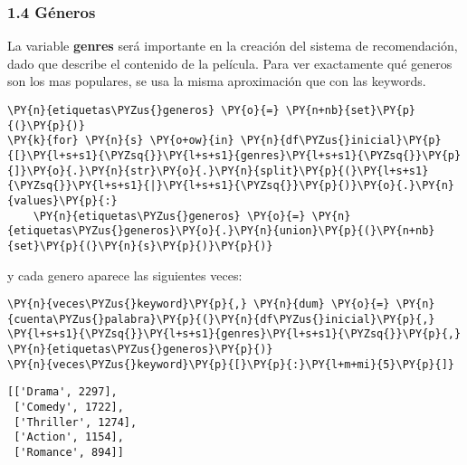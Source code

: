 \hypertarget{guxe9neros}{%
\subsubsection{1.4 Géneros}\label{guxe9neros}}

    La variable \textbf{genres} será importante en la creación del sistema
de recomendación, dado que describe el contenido de la película. Para
ver exactamente qué generos son los mas populares, se usa la misma
aproximación que con las keywords.

    \begin{tcolorbox}[breakable, size=fbox, boxrule=1pt, pad at break*=1mm,colback=cellbackground, colframe=cellborder]
\begin{Verbatim}[commandchars=\\\{\}]
\PY{n}{etiquetas\PYZus{}generos} \PY{o}{=} \PY{n+nb}{set}\PY{p}{(}\PY{p}{)}
\PY{k}{for} \PY{n}{s} \PY{o+ow}{in} \PY{n}{df\PYZus{}inicial}\PY{p}{[}\PY{l+s+s1}{\PYZsq{}}\PY{l+s+s1}{genres}\PY{l+s+s1}{\PYZsq{}}\PY{p}{]}\PY{o}{.}\PY{n}{str}\PY{o}{.}\PY{n}{split}\PY{p}{(}\PY{l+s+s1}{\PYZsq{}}\PY{l+s+s1}{|}\PY{l+s+s1}{\PYZsq{}}\PY{p}{)}\PY{o}{.}\PY{n}{values}\PY{p}{:}
    \PY{n}{etiquetas\PYZus{}generos} \PY{o}{=} \PY{n}{etiquetas\PYZus{}generos}\PY{o}{.}\PY{n}{union}\PY{p}{(}\PY{n+nb}{set}\PY{p}{(}\PY{n}{s}\PY{p}{)}\PY{p}{)}
\end{Verbatim}
\end{tcolorbox}

    y cada genero aparece las siguientes veces:

    \begin{tcolorbox}[breakable, size=fbox, boxrule=1pt, pad at break*=1mm,colback=cellbackground, colframe=cellborder]
\begin{Verbatim}[commandchars=\\\{\}]
\PY{n}{veces\PYZus{}keyword}\PY{p}{,} \PY{n}{dum} \PY{o}{=} \PY{n}{cuenta\PYZus{}palabra}\PY{p}{(}\PY{n}{df\PYZus{}inicial}\PY{p}{,} \PY{l+s+s1}{\PYZsq{}}\PY{l+s+s1}{genres}\PY{l+s+s1}{\PYZsq{}}\PY{p}{,} \PY{n}{etiquetas\PYZus{}generos}\PY{p}{)}
\PY{n}{veces\PYZus{}keyword}\PY{p}{[}\PY{p}{:}\PY{l+m+mi}{5}\PY{p}{]}
\end{Verbatim}
\end{tcolorbox}

            \begin{tcolorbox}[breakable, size=fbox, boxrule=.5pt, pad at break*=1mm, opacityfill=0]
\begin{Verbatim}[commandchars=\\\{\}]
[['Drama', 2297],
 ['Comedy', 1722],
 ['Thriller', 1274],
 ['Action', 1154],
 ['Romance', 894]]
\end{Verbatim}
\end{tcolorbox}
        
